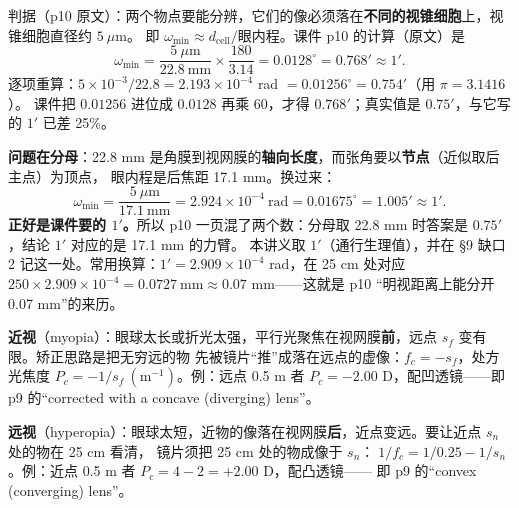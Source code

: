 ﻿\documentclass[11pt]{ctexart}
\begin{document}

判据（p10 原文）：两个物点要能分辨，它们的像必须落在\textbf{不同的视锥细胞}上，视锥细胞直径约 $5\ \mu\mathrm{m}$。
即 $\omega_{\min}\approx d_{\text{cell}}/\text{眼内程}$。课件 p10 的计算（原文）是
\[
\omega_{\min}=\frac{5\ \mu\mathrm{m}}{22.8\ \mathrm{mm}}\times\frac{180}{3.14}=0.0128^\circ=0.768'\approx1'.
\]
逐项重算：$5\times10^{-3}/22.8=2.193\times10^{-4}$ rad $=0.01256^\circ=0.754'$（用 $\pi=3.1416$）。
课件把 $0.01256$ 进位成 $0.0128$ 再乘 60，才得 $0.768'$；真实值是 $0.75'$，与它写的 $1'$ 已差 25\%。

\textbf{问题在分母}：22.8 mm 是角膜到视网膜的\textbf{轴向长度}，而张角要以\textbf{节点}（近似取后主点）为顶点，
眼内程是后焦距 17.1 mm。换过来：
\[
\omega_{\min}=\frac{5\ \mu\mathrm{m}}{17.1\ \mathrm{mm}}=2.924\times10^{-4}\ \mathrm{rad}
=0.01675^\circ=1.005'\approx1'.
\]
\textbf{正好是课件要的 $1'$。}所以 p10 一页混了两个数：分母取 22.8 mm 时答案是 $0.75'$，结论 $1'$ 对应的是 17.1 mm 的力臂。
本讲义取 $1'$（通行生理值），并在 §9 缺口 2 记这一处。常用换算：$1'=2.909\times10^{-4}$ rad，在 25 cm 处对应
$250\times2.909\times10^{-4}=0.0727\ \mathrm{mm}\approx0.07$ mm——这就是 p10 “明视距离上能分开 0.07 mm”的来历。



\textbf{近视}（myopia）：眼球太长或折光太强，平行光聚焦在视网膜\textbf{前}，远点 $s_f$ 变有限。矫正思路是把无穷远的物
先被镜片“推”成落在远点的虚像：$f_c=-s_f$，处方光焦度 $P_c=-1/s_f\ (\mathrm{m^{-1}})$。例：远点 0.5 m 者
$P_c=-2.00$ D，配凹透镜——即 p9 的“corrected with a concave (diverging) lens”。

\textbf{远视}（hyperopia）：眼球太短，近物的像落在视网膜\textbf{后}，近点变远。要让近点 $s_n$ 处的物在 25 cm 看清，
镜片须把 25 cm 处的物成像于 $s_n$：$\;1/f_c=1/0.25-1/s_n$。例：近点 0.5 m 者 $P_c=4-2=+2.00$ D，配凸透镜——
即 p9 的“convex (converging) lens”。

\end{document}
